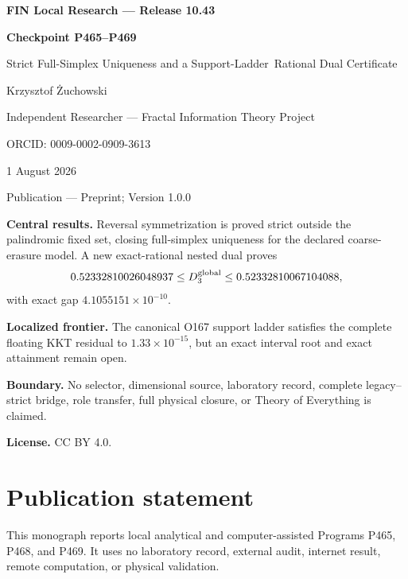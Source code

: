 \documentclass[11pt,a4paper,openany]{report}
\begin{document}
\hypersetup{pageanchor=false}
\begin{titlepage}\centering\vspace*{8mm}
{\Large\bfseries FIN Local Research --- Release 10.43\par}\vspace{10mm}
{\Huge\bfseries Checkpoint P465--P469\par}\vspace{6mm}
{\Large Strict Full-Simplex Uniqueness and a Support-Ladder\
Rational Dual Certificate\par}\vspace{14mm}
{\Large Krzysztof \.Zuchowski\par}\vspace{2mm}
{\normalsize Independent Researcher --- Fractal Information Theory Project\par}
{\normalsize ORCID: 0009-0002-0909-3613\par}\vspace{8mm}
{\large 1 August 2026\par}{\normalsize Publication --- Preprint; Version 1.0.0\par}
\vfill
\begin{minipage}{0.92\textwidth}\small
\textbf{Central results.} Reversal symmetrization is proved strict outside
the palindromic fixed set, closing full-simplex uniqueness for the declared
coarse-erasure model. A new exact-rational nested dual proves
\[
0.52332810026048937\le D_3^{\rm global}\le0.52332810067104088,
\]
with exact gap $4.1055151\times10^{-10}$.

\medskip\textbf{Localized frontier.} The canonical O167 support ladder
satisfies the complete floating KKT residual to $1.33\times10^{-15}$, but an
exact interval root and exact attainment remain open.

\medskip\textbf{Boundary.} No selector, dimensional source, laboratory
record, complete legacy--strict bridge, role transfer, full physical closure,
or Theory of Everything is claimed.

\medskip\textbf{License.} CC BY 4.0.
\end{minipage}\vfill\end{titlepage}
\hypersetup{pageanchor=true}
\chapter*{Publication statement}
This monograph reports local analytical and computer-assisted Programs P465,
P468, and P469. It uses no laboratory record, external audit, internet result,
remote computation, or physical validation.
\tableofcontents\clearpage{}
\end{document}
